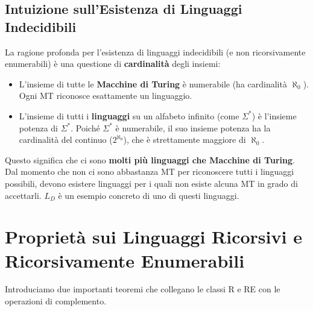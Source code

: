 \documentclass[a4paper, 11pt]{book} %
\theoremstyle{definition}
\begin{document}
\subsection{Intuizione sull'Esistenza di Linguaggi Indecidibili}

La ragione profonda per l'esistenza di linguaggi indecidibili (e non ricorsivamente enumerabili) è una questione di \textbf{cardinalità} degli insiemi:
\begin{itemize}
    \item L'insieme di tutte le \textbf{Macchine di Turing} è numerabile (ha cardinalità $\aleph_0$). Ogni MT riconosce esattamente un linguaggio.
    \item L'insieme di tutti i \textbf{linguaggi} su un alfabeto infinito (come $\Sigma^*$) è l'insieme potenza di $\Sigma^*$. Poiché $\Sigma^*$ è numerabile, il suo insieme potenza ha la cardinalità del continuo ($2^{\aleph_0}$), che è strettamente maggiore di $\aleph_0$.
\end{itemize}
Questo significa che ci sono \textbf{molti più linguaggi che Macchine di Turing}. Dal momento che non ci sono abbastanza MT per riconoscere tutti i linguaggi possibili, devono esistere linguaggi per i quali non esiste alcuna MT in grado di accettarli. $L_D$ è un esempio concreto di uno di questi linguaggi.

\section{Proprietà sui Linguaggi Ricorsivi e Ricorsivamente Enumerabili}

Introduciamo due importanti teoremi che collegano le classi R e RE con le operazioni di complemento.
\end{document}
